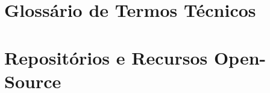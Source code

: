 \newpage
\chapter{Glossário de Termos Técnicos} \label{ap:glossario}


\newpage
\chapter{Repositórios e Recursos Open-Source} \label{ap:repositorios}


\newpage
\listoffigures
\listoftables
\newpage




